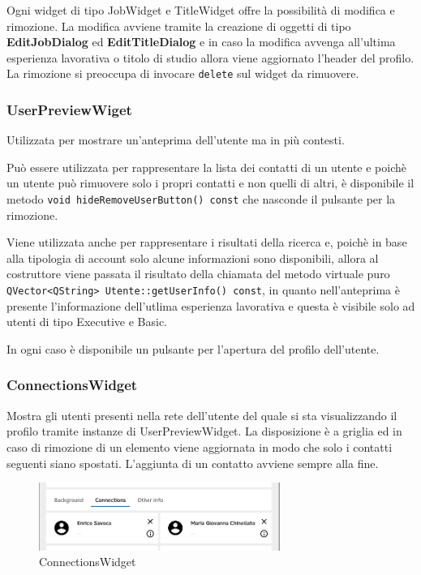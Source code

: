 \documentclass[a4paper,10pt]{article}
\begin{document}
Ogni widget di tipo JobWidget e TitleWidget offre la possibilità di modifica e rimozione. La modifica avviene tramite la creazione di oggetti di tipo \textbf{EditJobDialog} ed \textbf{EditTitleDialog} e in caso la modifica avvenga all'ultima esperienza lavorativa o titolo di studio allora viene aggiornato l'header del profilo. La rimozione si preoccupa di invocare \texttt{delete} sul widget da rimuovere.

\subsubsection*{UserPreviewWiget}
Utilizzata per mostrare un'anteprima dell'utente ma in più contesti.

Può essere utilizzata per rappresentare la lista dei contatti di un utente e poichè un utente può rimuovere solo i propri contatti e non quelli di altri, è disponibile il metodo \texttt{void hideRemoveUserButton() const} che nasconde il pulsante per la rimozione. 

Viene utilizzata anche per rappresentare i risultati della ricerca e, poichè in base alla tipologia di account solo alcune informazioni sono disponibili, allora al costruttore viene passata il risultato della chiamata del metodo virtuale puro \texttt{QVector<QString> Utente::getUserInfo() const}, in quanto nell'anteprima è presente l'informazione dell'utlima esperienza lavorativa e questa è visibile solo ad utenti di tipo Executive e Basic.

In ogni caso è disponibile un pulsante per l'apertura del profilo dell'utente.

\subsubsection*{ConnectionsWidget}
Mostra gli utenti presenti nella rete dell'utente del quale si sta visualizzando il profilo tramite instanze di UserPreviewWidget. La disposizione è a griglia ed in caso di rimozione di un elemento viene aggiornata in modo che solo i contatti seguenti siano spostati. L'aggiunta di un contatto avviene sempre alla fine.

\begin{figure}[!ht]
\centering
\includegraphics[width=0.7\textwidth]{ConnectionsWidget.png}
\caption{ConnectionsWidget}
\end{figure}
\end{document}
